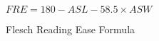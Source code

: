\begin{figure}[H]
	\caption{Flesch Reading Ease Formula}
	\label{fig:fre}
	\begin{center}
		\begin{math}
		FRE = 180 - ASL - 58.5 \times ASW
		\end{math}
	\end{center}
\end{figure}